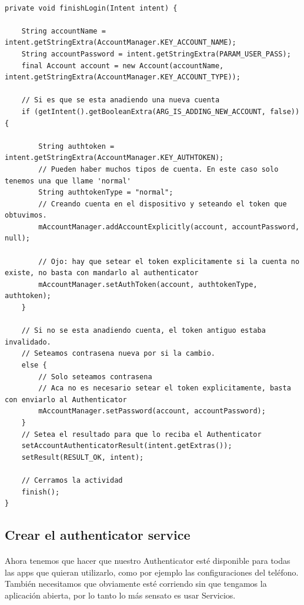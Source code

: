 \documentclass[10pt]{extarticle}
\begin{document}
\begin{lstlisting}

private void finishLogin(Intent intent) {

    String accountName = intent.getStringExtra(AccountManager.KEY_ACCOUNT_NAME);
    String accountPassword = intent.getStringExtra(PARAM_USER_PASS);
    final Account account = new Account(accountName, intent.getStringExtra(AccountManager.KEY_ACCOUNT_TYPE));

    // Si es que se esta anadiendo una nueva cuenta
    if (getIntent().getBooleanExtra(ARG_IS_ADDING_NEW_ACCOUNT, false)) {

        String authtoken = intent.getStringExtra(AccountManager.KEY_AUTHTOKEN);
        // Pueden haber muchos tipos de cuenta. En este caso solo tenemos una que llame 'normal'
        String authtokenType = "normal";
        // Creando cuenta en el dispositivo y seteando el token que obtuvimos.
        mAccountManager.addAccountExplicitly(account, accountPassword, null);

        // Ojo: hay que setear el token explicitamente si la cuenta no existe, no basta con mandarlo al authenticator
        mAccountManager.setAuthToken(account, authtokenType, authtoken);
    }

    // Si no se esta anadiendo cuenta, el token antiguo estaba invalidado.
    // Seteamos contrasena nueva por si la cambio.
    else {
        // Solo seteamos contrasena
        // Aca no es necesario setear el token explicitamente, basta con enviarlo al Authenticator
        mAccountManager.setPassword(account, accountPassword);
    }
    // Setea el resultado para que lo reciba el Authenticator
    setAccountAuthenticatorResult(intent.getExtras());
    setResult(RESULT_OK, intent);

    // Cerramos la actividad
    finish();
}

\end{lstlisting}


\subsection{Crear el authenticator service}

\paragraph{}
Ahora tenemos que hacer que nuestro Authenticator esté disponible para todas las apps que quieran utilizarlo, como por ejemplo las configuraciones del teléfono. También necesitamos que obviamente esté corriendo sin que tengamos la aplicación abierta, por lo tanto lo más sensato es usar Servicios.
\end{document}
